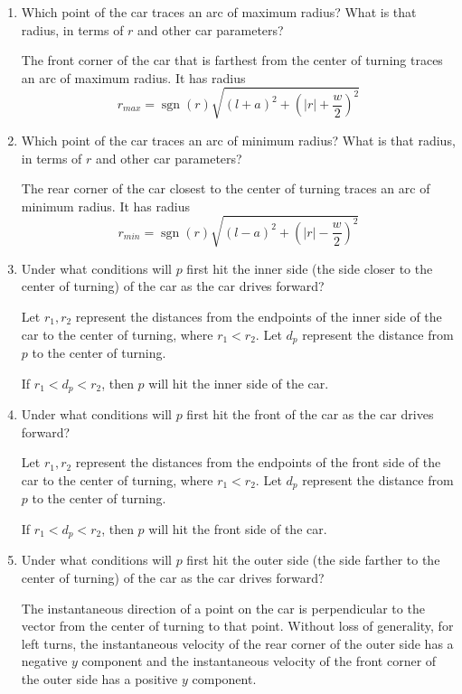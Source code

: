 \documentclass[11pt]{article}
\DeclareMathOperator{\sgn}{sgn}
\begin{document}
\begin{enumerate}[leftmargin=*]
    \item
    Which point of the car traces an arc of maximum radius? What is that radius,
    in terms of $r$ and other car parameters?

    The front corner of the car that is farthest from the center of turning
    traces an arc of maximum radius. It has radius
    $$ r_{max} = \sgn(r) \sqrt{\left(l + a\right)^2 + \left(\lvert r \rvert + \frac{w}{2}\right)^2} $$

    \item
    Which point of the car traces an arc of minimum radius? What is that radius,
    in terms of $r$ and other car parameters?

    The rear corner of the car closest to the center of turning traces an
    arc of minimum radius. It has radius
    $$ r_{min} = \sgn(r) \sqrt{\left(l - a \right)^2 + \left(\lvert r \rvert - \frac{w}{2}\right)^2} $$

    \item
    Under what conditions will $p$ first hit the inner side (the side closer to
    the center of turning) of the car as the car drives forward?


    Let $r_1, r_2$ represent the distances from the endpoints of the inner side
    of the car to the center of turning, where $r_1 < r_2$.  Let $d_p$ represent
    the distance from $p$ to the center of turning.

    If $r_1 < d_p < r_2$, then $p$ will hit the inner side of the car.

    \item
    Under what conditions will $p$ first hit the front of the car as the car
    drives forward?


    Let $r_1, r_2$ represent the distances from the endpoints of the front side
    of the car to the center of turning, where $r_1 < r_2$.  Let $d_p$ represent
    the distance from $p$ to the center of turning.

    If $r_1 < d_p < r_2$, then $p$ will hit the front side of the car.

    \item
    Under what conditions will $p$ first hit the outer side (the side farther to
    the center of turning) of the car as the car drives forward?

    The instantaneous direction of a point on the car is perpendicular to the
    vector from the center of turning to that point. Without loss of generality,
    for left turns, the instantaneous velocity of the rear corner of the outer
    side has a negative $y$ component and the instantaneous velocity of the
    front corner of the outer side has a positive $y$ component.


\end{enumerate}
\end{document}
